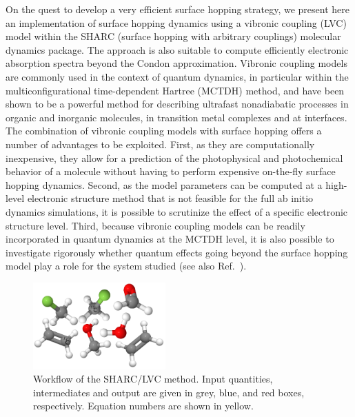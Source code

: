\documentclass[twoside,twocolumn,9pt]{article}
\begin{document}
On the quest to develop a very efficient surface hopping strategy, we present here an implementation of surface hopping dynamics using a vibronic coupling (LVC) model\cite{Koppel1984} within the SHARC (surface hopping with arbitrary couplings) molecular dynamics package.\cite{Richter2011, Mai2015, Sharc}
The approach is also suitable to compute efficiently electronic absorption spectra beyond the Condon approximation.
Vibronic coupling models are commonly used in the context of quantum dynamics, in particular within the multiconfigurational time-dependent Hartree (MCTDH) method,\cite{Beck2000} and have been shown to be a powerful method for describing ultrafast nonadiabatic processes in organic and inorganic molecules,\cite{Raab1999, Krawczyk2000, Faraji2008, Leveque2013} in transition metal complexes\cite{Worth2006, Eng2015, Fumanal2016} and at interfaces.\cite{Tamura2013}
The combination of vibronic coupling models with surface hopping offers a number of advantages to be exploited.
First, as they are computationally inexpensive, they allow for a prediction of the photophysical and photochemical behavior of a molecule without having to perform expensive on-the-fly surface hopping dynamics.
Second, as the model parameters can be computed at a high-level electronic structure method that is not feasible for the full ab initio dynamics simulations, it is possible to scrutinize the effect of a specific electronic structure level.
Third, because vibronic coupling models can be readily incorporated in quantum dynamics at the MCTDH level, it is also possible to investigate rigorously whether quantum effects going beyond the surface hopping model play a role for the system studied (see also Ref.~).


\begin{figure}
\centering
\includegraphics[width=2in]{allmolecules2}
\caption{Workflow of the SHARC/LVC method. Input quantities, intermediates and output are given in grey, blue, and red boxes, respectively. Equation numbers are shown in yellow.}
\label{fig:flow}
\end{figure}
\end{document}
